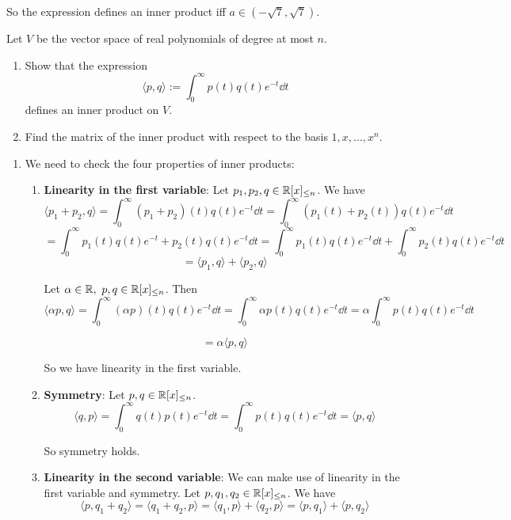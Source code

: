 \documentclass[12pt]{article}
\begin{document}
So the expression defines an inner product iff $a \in (-\sqrt{7}, \sqrt{7})$.

\begin{problem}{}{}
    Let $V$ be the vector space of real polynomials of degree at most $n$.
    \begin{enumerate}[label=\alph*)]
        \item Show that the expression
        $$
            \langle p, q \rangle := \int_{0}^{\infty} p(t)q(t)e^{-t}\dd t
        $$
        defines an inner product on $V$.
        \item Find the matrix of the inner product with respect to the basis $1, x, \dots, x^n$.
    \end{enumerate}
\end{problem}

\begin{enumerate}[label=\alph*)]
    \item We need to check the four properties of inner products:
    \begin{enumerate}[label=\arabic*.]
        \item \textbf{Linearity in the first variable}: Let $p_1, p_2, q \in \mathbb{R}[x]_{\leq n}$. We have
        $$
            \langle p_1 + p_2, q \rangle = \int_{0}^{\infty} (p_1 + p_2)(t)q(t)e^{-t}\dd t = \int_{0}^{\infty} (p_1(t) + p_2(t))q(t)e^{-t}\dd t
        $$
        $$
            = \int_{0}^{\infty} p_1(t)q(t)e^{-t} + p_2(t)q(t)e^{-t}\dd t = \int_{0}^{\infty} p_1(t)q(t)e^{-t} \dd t + \int_{0}^{\infty} p_2(t)q(t)e^{-t}\dd t
        $$
        $$
            = \langle p_1, q \rangle + \langle p_2, q \rangle
        $$

        Let $\alpha \in \mathbb{R},\ p, q \in \mathbb{R}[x]_{\leq n}$. Then
        $$
            \langle \alpha p, q \rangle = \int_{0}^{\infty} (\alpha p)(t)q(t)e^{-t}\dd t = \int_{0}^{\infty} \alpha p(t)q(t)e^{-t}\dd t = \alpha \int_{0}^{\infty} p(t)q(t)e^{-t}\dd t
        $$

        $$
            = \alpha \langle p, q \rangle
        $$

        So we have linearity in the first variable.

        \item \textbf{Symmetry}: Let $p, q \in \mathbb{R}[x]_{\leq n}$.
        $$
            \langle q, p \rangle = \int_{0}^{\infty} q(t)p(t)e^{-t}\dd t = \int_{0}^{\infty} p(t)q(t)e^{-t}\dd t = \langle p, q \rangle
        $$

        So symmetry holds.

        \item \textbf{Linearity in the second variable}: We can make use of linearity in the first variable and symmetry. Let $p, q_1, q_2 \in \mathbb{R}[x]_{\leq n}$. We have
        $$
            \langle p, q_1 + q_2 \rangle = \langle q_1 + q_2, p \rangle = \langle q_1, p \rangle + \langle q_2, p \rangle = \langle p, q_1 \rangle + \langle p, q_2 \rangle
        $$


\end{enumerate}
\end{enumerate}
\end{document}
